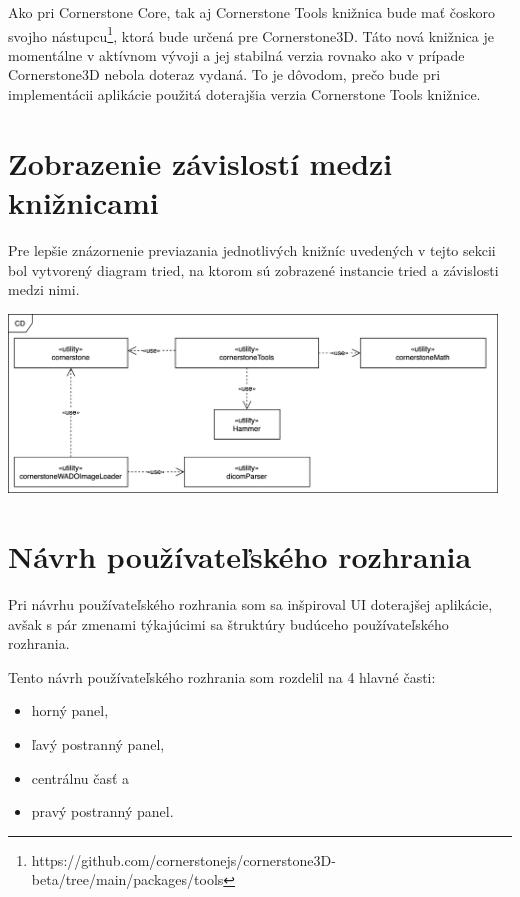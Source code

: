 Ako pri Cornerstone Core, tak aj Cornerstone Tools knižnica bude mať čoskoro svojho nástupcu\footnote{https://github.com/cornerstonejs/cornerstone3D-beta/tree/main/packages/tools}, ktorá bude určená pre Cornerstone3D. Táto nová knižnica je momentálne v aktívnom vývoji a jej stabilná verzia rovnako ako v prípade Cornerstone3D nebola doteraz vydaná. To je dôvodom, prečo bude pri implementácii aplikácie použitá doterajšia verzia Cornerstone Tools knižnice. \clearpage

\section {Zobrazenie závislostí medzi knižnicami}
Pre lepšie znázornenie previazania jednotlivých knižníc uvedených v tejto sekcii bol vytvorený diagram tried, na ktorom sú zobrazené instancie tried a závislosti medzi nimi.

\begin {center}
        \centering
        \includegraphics[height=4.75cm]{media/graphs/class_diagram.png}
        \captionsetup{justification=centering}
\end {center}

\section {Návrh používateľského rozhrania}
Pri návrhu používateľského rozhrania som sa inšpiroval UI doterajšej aplikácie, avšak s pár zmenami týkajúcimi sa štruktúry budúceho používateľského rozhrania.

Tento návrh používateľského rozhrania som rozdelil na 4 hlavné časti:
\begin {itemize}
\item {horný panel,}
\item {ľavý postranný panel,}
\item {centrálnu časť a}
\item {pravý postranný panel.}
\end {itemize}

